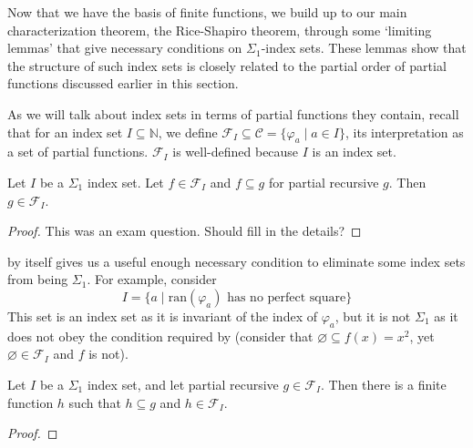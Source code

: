 Now that we have the basis of finite functions, we build up to our main characterization theorem, the Rice-Shapiro theorem, through some `limiting lemmas' that give necessary conditions on $\Sigma_1$-index sets. These lemmas show that the structure of such index sets is closely related to the partial order of partial functions discussed earlier in this section.

As we will talk about index sets in terms of partial functions they contain, recall that for an index set $I \subseteq \mathbb{N}$, we define $\mathscr{F}_I \subseteq \mathscr{C} = \{ \varphi_a \mid a \in I \}$, its interpretation as a set of partial functions. $\mathscr{F}_I$ is well-defined because $I$ is an index set.

\begin{lemma}\label{index-upper-set}
Let $I$ be a $\Sigma_1$ index set. Let $f \in \mathscr{F}_I$ and $f \subseteq g$ for partial recursive $g$. Then $g \in \mathscr{F}_I$.
\end{lemma}
\begin{proof}
This was an exam question. Should fill in the details?
\end{proof}

 by itself gives us a useful enough necessary condition to eliminate some index sets from being $\Sigma_1$. For example, consider \[I = \{ a \mid \text{ran}(\varphi_a) \text{ has no perfect square} \}\] This set is an index set as it is invariant of the index of $\varphi_a$, but it is not $\Sigma_1$ as it does not obey the condition required by  (consider that $\varnothing \subseteq f(x) = x^2$, yet $\varnothing \in \mathscr{F}_I$ and $f$ is not).

\begin{lemma}\label{index-finite-subfunction}
Let $I$ be a $\Sigma_1$ index set, and let partial recursive $g \in \mathscr{F}_I$. Then there is a finite function $h$ such that $h \subseteq g$ and $h \in \mathscr{F}_I$.
\end{lemma}
\begin{proof}

\end{proof}

